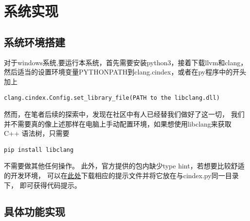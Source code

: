 \chapter{系统实现}
\section{系统环境搭建}
对于windows系统,要运行本系统，首先需要安装python3，接着下载llvm和clang，然后适当的设置环境变量PYTHONPATH到clang.cindex，或者在py程序中的开头加上

\begin{lstlisting}[language=Python]
clang.cindex.Config.set_library_file(PATH to the libclang.dll)
\end{lstlisting}


然而，在笔者后续的探索中，发现在社区中有人已经替我们做好了这一切，
我们并不需要真的像上述那样在电脑上手动配置环境，如果想使用libclang来获取 C++ 语法树，只需要
\begin{lstlisting}[language=bash]
pip install libclang
\end{lstlisting}
不需要做其他任何操作。
此外，官方提供的包内缺少type hint，若想要比较舒适的开发环境，
可以在\href{https://github.com/16bit-ykiko/clang-related/blob/main/cindex.pyi}{此处}下载相应的提示文件并将它放在与cindex.py同一目录下，
即可获得代码提示。
\section{具体功能实现}
